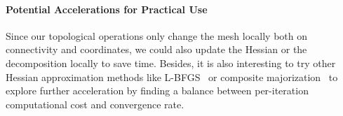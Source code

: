 
\paragraph{Potential Accelerations for Practical Use}
Since our topological operations only change the mesh locally both on connectivity and coordinates, we could also update the Hessian or the decomposition locally to save time. Besides, it is also interesting to try other Hessian approximation methods like L-BFGS~\cite{Liu1989Limited} or composite majorization~\cite{Shtengel2017Geometric} to explore further acceleration by finding a balance between per-iteration computational cost and convergence rate.
